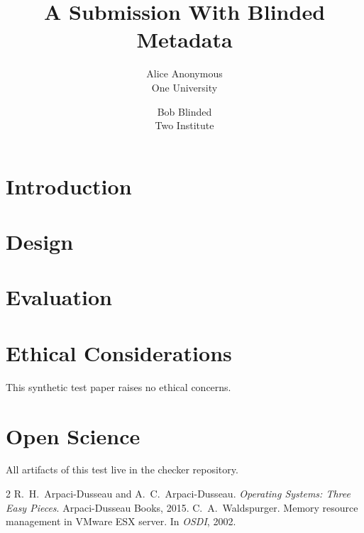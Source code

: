 \documentclass[letterpaper,twocolumn,10pt]{article}
\date{}
\title{\Large \bf A Submission With Blinded Metadata}
\author{{\rm Alice Anonymous}\\One University \and {\rm Bob Blinded}\\Two Institute}
\begin{document}
\maketitle

\begin{abstract}
\lipsum[1][1-5]
\end{abstract}

\section{Introduction}
\lipsum[2-4]

\section{Design}
\lipsum[5-7]

\section{Evaluation}
\lipsum[8-9]

\appendix
\section*{Ethical Considerations}
This synthetic test paper raises no ethical concerns.

\section*{Open Science}
All artifacts of this test live in the checker repository.

\begin{thebibliography}{2}
 R.~H.\ Arpaci-Dusseau and A.~C.\ Arpaci-Dusseau.
  \emph{Operating Systems: Three Easy Pieces}. Arpaci-Dusseau Books, 2015.
 C.~A.\ Waldspurger. Memory resource management in VMware ESX
  server. In \emph{OSDI}, 2002.
\end{thebibliography}
\end{document}
